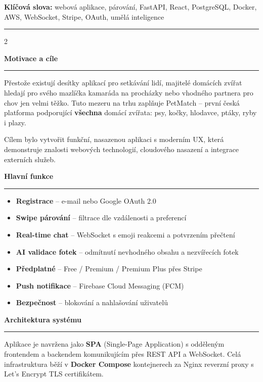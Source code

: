 \documentclass[final]{beamer}
\newcommand{\Heading}[1]{%
  \vspace{1em}%
  {\color{jecnaBlue}\bfseries\fontsize{56}{70}\selectfont #1}\par
  \noindent\textcolor{accentOrange}{\rule{\linewidth}{3pt}}\par
  \vspace{0.5em}%
}
\begin{document}
\begin{frame}[t]
\begin{abstractbox}
{  \vspace{0.5em}
  \textbf{Klíčová slova:} webová aplikace, párování, FastAPI, React, PostgreSQL, Docker, AWS, WebSocket, Stripe, OAuth, umělá inteligence
  }
\end{abstractbox}

\vspace{1.2em}
\noindent\rule{\linewidth}{2pt}
\vspace{0.5em}

\begin{multicols}{2}

\Heading{Motivace a cíle}

{\fontsize{32}{42}\selectfont
Přestože existují desítky aplikací pro setkávání lidí, majitelé domácích zvířat hledají pro svého mazlíčka kamaráda na procházky nebo vhodného partnera pro chov jen velmi těžko. Tuto mezeru na trhu zaplňuje PetMatch – první česká platforma podporující \textbf{všechna} domácí zvířata: psy, kočky, hlodavce, ptáky, ryby i plazy.

Cílem bylo vytvořit funkční, nasazenou aplikaci s moderním UX, která demonstruje znalosti webových technologií, cloudového nasazení a integrace externích služeb.
}

\Heading{Hlavní funkce}

{\fontsize{32}{42}\selectfont
\begin{itemize}
  \item \textbf{Registrace} – e-mail nebo Google OAuth 2.0
  \item \textbf{Swipe párování} – filtrace dle vzdálenosti a preferencí
  \item \textbf{Real-time chat} – WebSocket s emoji reakcemi a potvrzením přečtení
  \item \textbf{AI validace fotek} – odmítnutí nevhodného obsahu a nezvířecích fotek
  \item \textbf{Předplatné} – Free / Premium / Premium Plus přes Stripe
  \item \textbf{Push notifikace} – Firebase Cloud Messaging (FCM)
  \item \textbf{Bezpečnost} – blokování a nahlašování uživatelů
\end{itemize}
}

\Heading{Architektura systému}

{\fontsize{32}{42}\selectfont
Aplikace je navržena jako \textbf{SPA} (Single-Page Application) s odděleným frontendem a backendem komunikujícím přes REST API a WebSocket. Celá infrastruktura běží v \textbf{Docker Compose} kontejnerech za Nginx reverzní proxy s Let's Encrypt TLS certifikátem.
}


\end{multicols}
\end{frame}
\end{document}
